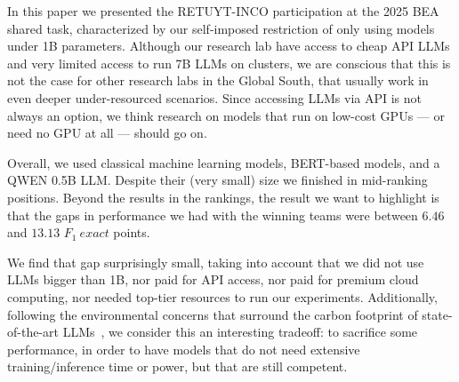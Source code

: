 \documentclass[11pt]{article}
\begin{document}
In this paper we presented the RETUYT-INCO participation at the 2025 BEA shared task, characterized by our self-imposed restriction of only using models under 1B parameters.
Although our research lab have access to cheap API LLMs and very limited access to run 7B LLMs on clusters, we are conscious that this is not the case for other research labs in the Global South, that usually work in even deeper under-resourced scenarios.
Since accessing LLMs via API is not always an option, we think research on models that run on low-cost GPUs --- or need no GPU at all --- should go on.

Overall, we used classical machine learning models, BERT-based models, and a QWEN 0.5B LLM.
Despite their (very small) size we finished in mid-ranking positions.
Beyond the results in the rankings, the result we want to highlight is that the gaps in performance we had with the winning teams were between $6.46$ and $13.13$ $F_1\ exact$ points.

We find that gap surprisingly small, taking into account that we did not use LLMs bigger than 1B, nor paid for API access, nor paid for premium cloud computing, nor needed top-tier resources to run our experiments.
Additionally, following the environmental concerns that surround the carbon footprint of state-of-the-art LLMs~\citep{luccioni2023estimating,faizllmcarbon,liu2024green}, we consider this an interesting tradeoff: to sacrifice some performance, in order to have models that do not need extensive training/inference time or power, but that are still competent.



\end{document}
